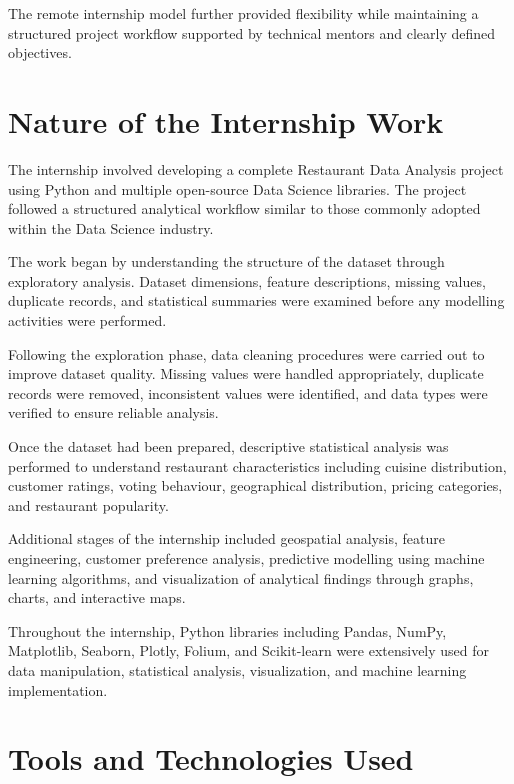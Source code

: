 \documentclass[12pt,a4paper]{report}
\begin{document}
The remote internship model further provided flexibility while maintaining a structured project workflow supported by technical mentors and clearly defined objectives.


\section{Nature of the Internship Work}

The internship involved developing a complete Restaurant Data Analysis project using Python and multiple open-source Data Science libraries. The project followed a structured analytical workflow similar to those commonly adopted within the Data Science industry.

The work began by understanding the structure of the dataset through exploratory analysis. Dataset dimensions, feature descriptions, missing values, duplicate records, and statistical summaries were examined before any modelling activities were performed.

Following the exploration phase, data cleaning procedures were carried out to improve dataset quality. Missing values were handled appropriately, duplicate records were removed, inconsistent values were identified, and data types were verified to ensure reliable analysis.

Once the dataset had been prepared, descriptive statistical analysis was performed to understand restaurant characteristics including cuisine distribution, customer ratings, voting behaviour, geographical distribution, pricing categories, and restaurant popularity.

Additional stages of the internship included geospatial analysis, feature engineering, customer preference analysis, predictive modelling using machine learning algorithms, and visualization of analytical findings through graphs, charts, and interactive maps.

Throughout the internship, Python libraries including Pandas, NumPy, Matplotlib, Seaborn, Plotly, Folium, and Scikit-learn were extensively used for data manipulation, statistical analysis, visualization, and machine learning implementation.


\section{Tools and Technologies Used}
\end{document}
